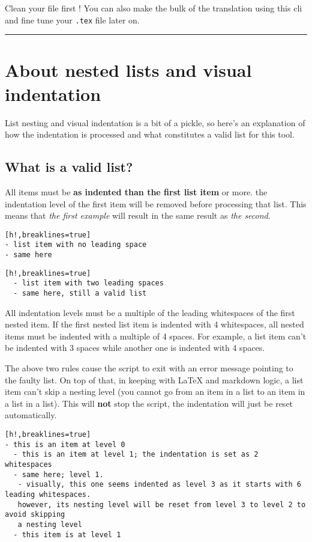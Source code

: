 \documentclass[a4paper, 12pt, twoside]{book}
\begin{document}
Clean your file first ! You can also make the bulk of the translation using this cli and fine tune your \texttt{.tex} 
file later on.

\par\noindent\rule{\linewidth}{0.4pt}
\section*{About nested lists and visual indentation}

List nesting and visual indentation is a bit of a pickle, so here's an explanation of how
the indentation is processed and what constitutes a valid list for this tool.
\subsection*{What is a valid list?}

All items must be \textbf{as indented than the first list item} or more. the indentation level of the first item
will be removed before processing that list. This means that \textit{the first example} will result in the same
result as \textit{the second}.

\begin{Verbatim}[h!,breaklines=true]
- list item with no leading space
- same here
\end{Verbatim}

\begin{Verbatim}[h!,breaklines=true]
  - list item with two leading spaces
  - same here, still a valid list
\end{Verbatim}

All indentation levels must be a multiple of the leading whitespaces of the first nested item. If the first nested 
list item is indented with 4 whitespaces, all nested items must be indented with a multiple of 4 spaces. For example,
a list item can't be indented with 3 spaces while another one is indented with 4 spaces.

The above two rules cause the script to exit with an error message pointing to the faulty list. On top of that,
in keeping with LaTeX and markdown logic, a list item can't skip a nesting level (you cannot go from an item in a list
to an item in a list in a list). This will \textbf{not} stop the script, the indentation will just be reset automatically.

\begin{Verbatim}[h!,breaklines=true]
- this is an item at level 0
  - this is an item at level 1; the indentation is set as 2 whitespaces
  - same here; level 1.
   - visually, this one seems indented as level 3 as it starts with 6 leading whitespaces.
   however, its nesting level will be reset from level 3 to level 2 to avoid skipping
   a nesting level
  - this item is at level 1
\end{Verbatim}
\end{document}
